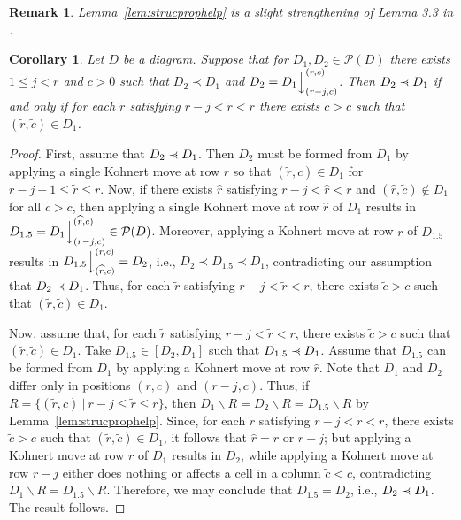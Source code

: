 \documentclass[letterpaper,10pt]{article}
\newtheorem{corollary}[theorem]{Corollary}
\newtheorem{remark}[theorem]{Remark}
\newcommand{\ldownarrow}{\Big\downarrow}
\newcommand{\precdot}{\prec\mathrel{\mkern-5mu}\mathrel{\cdot}}
\begin{document}
\begin{remark}
    Lemma~\ref{lem:strucprophelp} is a slight strengthening of Lemma 3.3 in \textup{\textbf{\cite{KPoset1}}}.
\end{remark}

\begin{corollary}\label{cor:cover}
    Let $D$ be a diagram. Suppose that for $D_1,D_2\in \mathcal{P}(D)$ there exists $1\le j<r$ and $c>0$ such that $D_2\prec D_1$ and $D_2=D_1\ldownarrow^{(r,c)}_{(r-j,c)}$. Then $D_2\precdot D_1$ if and only if for each $\tilde{r}$ satisfying $r-j<\tilde{r}<r$ there exists $\tilde{c}>c$ such that $(\tilde{r},\tilde{c})\in D_1$.
\end{corollary}
\begin{proof}
    First, assume that $D_2\precdot D_1$. Then $D_2$ must be formed from $D_1$ by applying a single Kohnert move at row $r$ so that $(\tilde{r},c)\in D_1$ for $r-j+1\le \tilde{r}\le r$. Now, if there exists $\widehat{r}$ satisfying $r-j<\widehat{r}<r$ and $(\widehat{r},\tilde{c})\notin D_1$ for all $\tilde{c}>c$, then applying a single Kohnert move at row $\widehat{r}$ of $D_1$ results in $D_{1.5}=D_1\ldownarrow^{(\widehat{r},c)}_{(r-j,c)}\in \mathcal{P}(D)$. Moreover, applying a Kohnert move at row $r$ of $D_{1.5}$ results in $D_{1.5}\ldownarrow^{(r,c)}_{(\widehat{r},c)}=D_2$, i.e., $D_2\prec D_{1.5}\prec D_1$, contradicting our assumption that $D_2\precdot D_1$. Thus, for each $\tilde{r}$ satisfying $r-j<\tilde{r}<r$, there exists $\tilde{c}>c$ such that $(\tilde{r},\tilde{c})\in D_1$.
    
    Now, assume that, for each $\tilde{r}$ satisfying $r-j<\tilde{r}<r$, there exists $\tilde{c}>c$ such that $(\tilde{r},\tilde{c})\in D_1$. Take $D_{1.5}\in [D_2,D_1]$ such that $D_{1.5}\precdot D_1$. Assume that $D_{1.5}$ can be formed from $D_1$ by applying a Kohnert move at row $\widehat{r}$. Note that $D_1$ and $D_2$ differ only in positions $(r,c)$ and $(r-j,c)$. Thus, if $R=\{(\tilde{r},c)~|~r-j\le \tilde{r}\le r\}$, then $D_1\backslash R=D_2\backslash R=D_{1.5}\backslash R$ by Lemma~\ref{lem:strucprophelp}. Since, for each $\tilde{r}$ satisfying $r-j<\tilde{r}<r$, there exists $\tilde{c}>c$ such that $(\tilde{r},\tilde{c})\in D_1$, it follows that $\widehat{r}=r$ or $r-j$; but applying a Kohnert move at row $r$ of $D_1$ results in $D_2$, while applying a Kohnert move at row $r-j$ either does nothing or affects a cell in a column $\tilde{c}<c$, contradicting $D_1\backslash R=D_{1.5}\backslash R$. Therefore, we may conclude that $D_{1.5}=D_2$, i.e., $D_2\precdot D_1$. The result follows. 
\end{proof}
\end{document}

